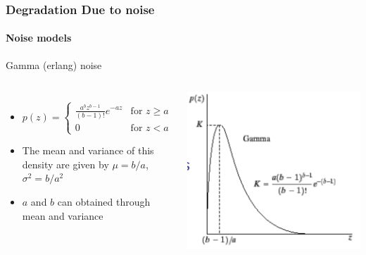 \documentclass{beamer}
\begin{document}
\begin{frame}	
\frametitle{Degradation Due to noise}
\framesubtitle{Noise models}
\begin{block}{Gamma (erlang) noise}
\begin{columns}
\begin{itemize}
	\item [] 
		\[
 	p(z) = 
  	\begin{cases} 
   	\frac{a^b z^{b-1}}{(b-1)!}e^{-az} & \text{for } z \geq a \\
   	0 & \text{for } z < a
  	\end{cases}
	\]
	\item The mean and variance of this density are given by
	$\mu = b/a$, $\sigma^2 = b/a^2$
	\item $a$ and $b$ can obtained through mean and variance  
\end{itemize}
\includegraphics[scale=0.23]{images/L5_DR_EN1.png}
\end{columns}		
\end{block}
\end{frame}
\end{document}
